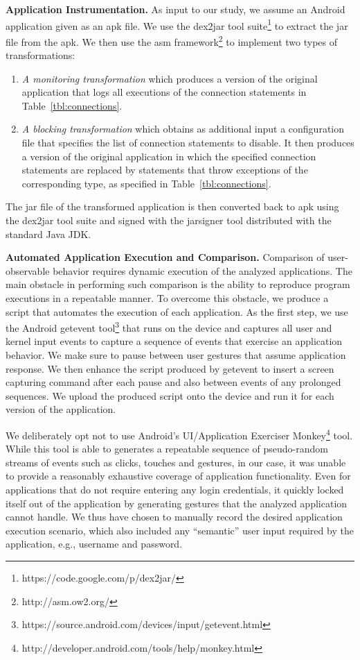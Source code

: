 \vspace{0.1in}
\noindent 
{\bf Application Instrumentation.}
As input to our study, we assume an Android application given as an apk file. 
We use the dex2jar tool suite\footnote{https://code.google.com/p/dex2jar/} to extract the jar file from the apk.
We then use the asm framework\footnote{http://asm.ow2.org/} to implement two types of transformations: 
\begin{enumerate}
\item \emph{A monitoring transformation} which produces a version of the original application that logs all executions of the connection statements in Table~\ref{tbl:connections}. 
\item \emph{A blocking transformation} which obtains as additional input a configuration file that specifies the list of connection statements to disable. It then produces a version of the original application in which the specified connection statements are replaced by statements that throw exceptions of the corresponding type, as specified in Table~\ref{tbl:connections}.
\end{enumerate}
The jar file of the transformed application is then converted back to apk using the dex2jar tool suite and signed with the jarsigner tool distributed with the standard Java JDK.
 

\vspace{0.1in}
\noindent 
{\bf Automated Application Execution and Comparison.}
Comparison of user-observable behavior requires dynamic execution of the analyzed applications. 
The main obstacle in performing such comparison is the ability to reproduce program executions in a repeatable manner. 
To overcome this obstacle, we produce a script that automates the execution of each application.
As the first step, we use the Android getevent tool\footnote{https://source.android.com/devices/input/getevent.html} that runs on the device and captures all user and kernel input events to capture a sequence of events that exercise an application behavior. We make sure to pause between user gestures that assume application response. 
We then enhance the script produced by getevent to insert a screen capturing command after each pause and also between events of any prolonged sequences. 
We upload the produced script onto the device and run it for each version of the application. 

We deliberately opt not to use Android's UI/Application Exerciser Monkey\footnote{http://developer.android.com/tools/help/monkey.html} tool. While this tool is able to  
generates a repeatable sequence of pseudo-random streams of events such as clicks, touches and gestures, in our case, 
it was unable to provide a reasonably exhaustive
coverage of application functionality. Even for applications that do not require entering any login credentials, it quickly locked itself out of the application by generating gestures that the analyzed application cannot handle. 
We thus have chosen to manually record the desired application execution scenario, which also included any ``semantic'' user input required by the application, e.g., username and password. 


